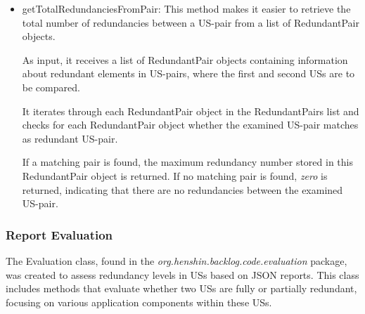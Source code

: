 \begin{itemize}
	\item getTotalRedundanciesFromPair: This method makes it easier to retrieve the total number of redundancies between a US-pair from a list of RedundantPair objects.
	
	As input, it receives a list of RedundantPair objects containing information about redundant elements in US-pairs, where the first and second USs are to be compared.
	
	It iterates through each RedundantPair object in the RedundantPairs list and checks for each RedundantPair object whether the examined US-pair matches as redundant US-pair. 
	
	If a matching pair is found, the maximum redundancy number stored in this RedundantPair object is returned. If no matching pair is found, \textit{zero} is returned, indicating that there are no redundancies between the examined US-pair.
\end{itemize}
\subsubsection*{Report Evaluation}\label{step_report_evaluation}
The Evaluation class, found in the \textit{org.henshin.backlog.code.evaluation} package, was created to assess redundancy levels in USs based on JSON reports. This class includes methods that evaluate whether two USs are fully or partially redundant, focusing on various application components within these USs.

